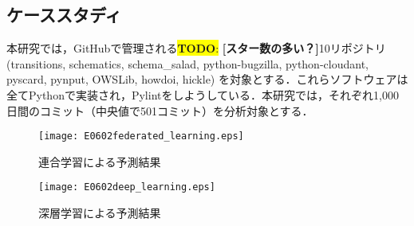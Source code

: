 \documentclass[uplatex,dvipdfmx,a4paper,twocolumn,base=11pt,jbase=11pt,ja=standard]{bxjsarticle}  %
\newcommand{\todo}[1]{\colorbox{yellow}{{\bf TODO}:}{\color{red} {\textbf{[#1]}}}}
\begin{document}





\subsection{ケーススタディ}
本研究では，GitHubで管理される\todo{スター数の多い？}10リポジトリ (transitions, schematics, schema\_salad, python-bugzilla, python-cloudant, pyscard, pynput, OWSLib, howdoi, hickle) を対象とする．これらソフトウェアは全てPythonで実装され，Pylintをしようしている．本研究では，それぞれ1,000日間のコミット（中央値で501コミット）を分析対象とする．






%

\begin{figure}
\begin{center}
\texttt{[image: E0602federated\_learning.eps]}
\vspace{-3mm}
\caption{連合学習による予測結果}
\label{fig:fed}
\end{center}

\vspace{-8mm}

\begin{center}
\texttt{[image: E0602deep\_learning.eps]}
\vspace{-3mm}
\caption{深層学習による予測結果}
\label{fig:deep}
\end{center}
\vspace{-12mm}
\end{figure}
\end{document}
